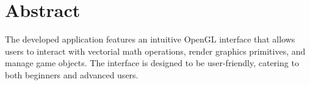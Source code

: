\part*{Abstract} 
\blankpage
{}

The developed application features an intuitive OpenGL interface that
allows users to interact with vectorial math operations, render graphics
primitives, and manage game objects. The interface is designed to be
user-friendly, catering to both beginners and advanced users.




